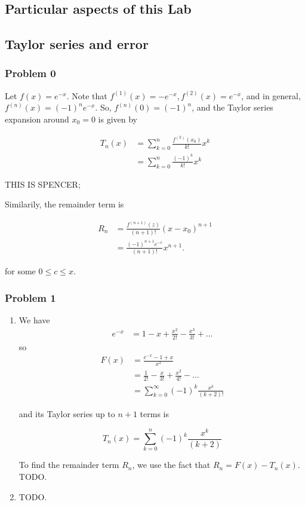 \documentclass[letter,11pt]{article}
\begin{document}
\subsection*{Particular aspects of this Lab }

\subsection*{Taylor series and error}
\subsubsection*{Problem 0}
Let $f(x) = e^{-x}$. Note that $f^{(1)}(x) = -e^{-x}, f^{(2)}(x) = e^{-x}$, and in general, $f^{(n)}(x) = (-1)^ne^{-x}$. So, $f^{(n)}(0) = (-1)^n$, and the Taylor series expansion around $x_0 = 0$ is given by

\begin{align*}
T_n(x) &= \sum_{k = 0}^n \frac{f^{(k)}(x_0)}{k!} x^k \\
&= \sum_{k = 0}^n \frac{(-1)^k}{k!}x^k
\end{align*}

THIS IS SPENCER;

Similarily, the remainder term is

\begin{align*}
R_n &= \frac{f^{(n + 1)}(z)}{(n + 1)!}(x - x_0)^{n + 1} \\
&= \frac{(-1)^{n + 1} e^{-c}}{(n + 1)!}x^{n + 1}.
\end{align*}

for some $0 \leq c \leq x$.

\subsubsection*{Problem 1}
\begin{enumerate}[label=\alph*.]
  \item We have \begin{align*}
    e^{-x} &= 1 - x + \frac{x^2}{2!} - \frac{x^3}{3!} + \dots
  \end{align*}
  so
  \begin{align*}
    F(x) &= \frac{e^{-x} - 1 + x}{x^2} \\
    &= \frac{1}{2!} - \frac{x}{3!} + \frac{x^2}{4!} - \dots \\
    &= \sum_{k = 0}^\infty (-1)^k \frac{x^k}{(k + 2)!}
  \end{align*}

  and its Taylor series up to $n + 1$ terms is

  $$
  T_n(x) = \sum_{k = 0}^n (-1)^k \frac{x^k}{(k + 2)}
  $$

  To find the remainder term $R_n$, we use the fact that $R_n = F(x) - T_n(x)$. TODO.
  \item TODO.
\end{enumerate}
\end{document}
